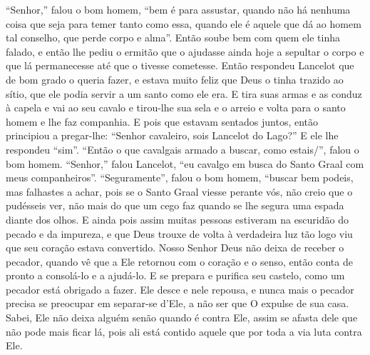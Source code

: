 “Senhor,” falou o bom homem, “bem é para assustar, quando não há nenhuma
coisa que seja para temer tanto como essa, quando ele é aquele que dá ao homem
tal conselho, que perde corpo e alma”. Então soube bem com quem ele
tinha falado, e então lhe pediu o ermitão que o ajudasse ainda hoje a sepultar
o corpo e que lá permanecesse até que o tivesse cometesse. Então respondeu
Lancelot que de bom grado o queria fazer, e estava muito feliz que Deus o
tinha trazido ao sítio, que ele podia servir a um santo como ele era. E tira
suas armas e as conduz à capela e vai ao seu cavalo e tirou-lhe sua sela e o
arreio e volta para o santo homem e lhe faz companhia. E pois que estavam
sentados juntos, então principiou a pregar-lhe: “Senhor cavaleiro, sois
Lancelot do Lago?” E ele lhe respondeu “sim”. “Então o que cavalgais armado a
buscar, como estais/”, falou o bom homem. “Senhor,” falou Lancelot, “eu
cavalgo em busca do Santo Graal com meus companheiros”. “Seguramente”, falou o
bom homem, “buscar bem podeis, mas falhastes a achar, pois se o Santo Graal
viesse perante vós, não creio que o pudésseis ver, não mais do que um cego faz
quando se lhe segura uma espada diante dos olhos. E ainda pois assim muitas
pessoas estiveram na escuridão do pecado e da impureza, e que Deus trouxe de
volta à verdadeira luz tão logo viu que seu coração estava convertido. Nosso
Senhor Deus não deixa de receber o pecador, quando vê que a Ele retornou com o
coração e o senso, então conta de pronto a consolá-lo e a ajudá-lo. E se
prepara e purifica seu castelo, como um pecador está obrigado a fazer. Ele desce
e nele repousa, e nunca mais o pecador precisa se preocupar em separar-se
d’Ele, a não ser que O expulse de sua casa. Sabei, Ele não deixa alguém senão
quando é contra Ele, assim se afasta dele que não pode mais ficar lá, pois ali
está contido aquele que por toda a via luta contra Ele.

